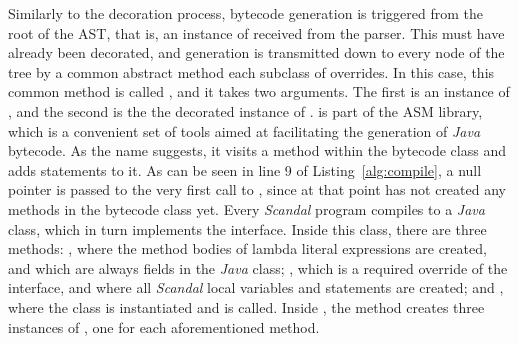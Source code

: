 Similarly to the decoration process, bytecode generation is triggered from the root of the AST, that is, an instance of  received from the parser. This  must have already been decorated, and generation is transmitted down to every node of the tree by a common abstract method each subclass of  overrides. In this case, this common method is called , and it takes two arguments. The first is an instance of , and the second is the the decorated instance of .  is part of the ASM library, which is a convenient set of tools aimed at facilitating the generation of \emph{Java} bytecode. As the name suggests, it visits a method within the bytecode class and adds statements to it. As can be seen in line 9 of Listing~\ref{alg:compile}, a null pointer is passed to the very first call to , since at that point  has not created any methods in the bytecode class yet. Every \emph{Scandal} program compiles to a \emph{Java} class, which in turn implements the  interface. Inside this class, there are three methods: , where the method bodies of lambda literal expressions are created,  and which are always fields in the \emph{Java} class; , which is a required override of the  interface, and where all \emph{Scandal} local variables and statements are created; and , where the class is instantiated and  is called. Inside , the  method creates three instances of , one for each aforementioned method.

